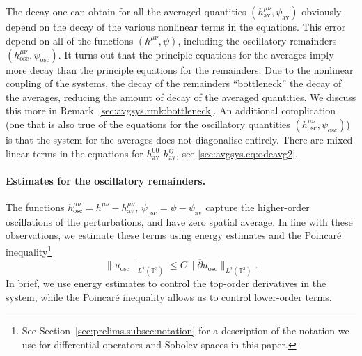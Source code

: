 \documentclass{article}
\newcommand{\TT}{\mathbb{T}}
\newcommand{\osc}{\mathrm{osc}}
\newcommand{\av}{\mathrm{av}}
\newcommand{\ol}{\overline}
\newcommand{\pa}{\partial}
\begin{document}
\begin{remark}\label{sec:intro.rmk:bottleneck}
    The decay one can obtain for all the averaged quantities $(h_{\av}^{\mu\nu},\psi_{\av})$ obviously depend on the decay of the various nonlinear terms in the equations. This error depend on all of the functions $(h^{\mu\nu},\psi)$, including the oscillatory remainders $(h_{\osc}^{\mu\nu},\psi_{\osc})$. It turns out that the principle equations for the averages imply more decay than the principle equations for the remainders. Due to the nonlinear coupling of the systems, the decay of the remainders ``bottleneck'' the decay of the averages, reducing the amount of decay of the averaged quantities. We discuss this more in Remark~\ref{sec:avgsys.rmk:bottleneck}. An additional complication (one that is also true of the equations for the oscillatory quantities $(h_{\osc}^{\mu\nu},\psi_{\osc})$) is that the system for the averages does not diagonalise entirely. There are mixed linear terms in the equations for $h_{\av}^{00}$ $h_{\av}^{ij}$, see \eqref{sec:avgsys.eq:odeavg2}.
\end{remark}
\paragraph{Estimates for the oscillatory remainders.}
The functions $h_{\osc}^{\mu\nu} = h^{\mu\nu} - h_{\av}^{\mu\nu}$, $\psi_{\osc} = \psi - \psi_{\av}$ capture the higher-order oscillations of the perturbations, and have zero spatial average. In line with these observations, we estimate these terms using energy estimates and the  Poincar\'e inequality\footnote{See Section~\ref{sec:prelims.subsec:notation} for a description of the notation we use for differential operators and Sobolev spaces in this paper.}
\begin{equation}\label{sec:intro.sec:avgsys.eq:poincare}
    \|u_{\osc}\|_{L^2(\TT^3)}\leq C\|\ol{\pa} u_{\osc}\|_{L^2(\TT^3)}.
\end{equation}
In brief, we use energy estimates to control the top-order derivatives in the system, while the Poincar\'e inequality allows us to control lower-order terms.
\end{document}
